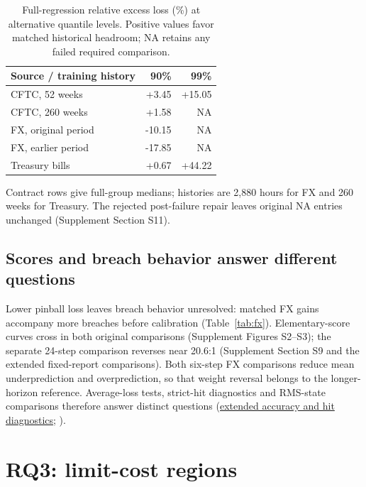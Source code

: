 \documentclass[11pt,a4paper]{article}
\begin{document}
\begin{table}[htbp]\centering\small
\caption{Full-regression relative excess loss (\%) at alternative quantile levels. Positive values favor matched historical headroom; NA retains any failed required comparison.}\label{tab:v12-tau}
\begin{tabular}{lrr}\toprule
Source / training history & 90\% & 99\% \\\midrule
CFTC, 52 weeks & +3.45 & +15.05 \\
CFTC, 260 weeks & +1.58 & \textsc{NA} \\
FX, original period & -10.15 & \textsc{NA} \\
FX, earlier period & -17.85 & \textsc{NA} \\
Treasury bills & +0.67 & +44.22 \\
\bottomrule\end{tabular}
\par\vspace{2pt}\begin{minipage}{.95\linewidth}\footnotesize
Contract rows give full-group medians; histories are 2,880 hours for FX and 260 weeks for Treasury.
The rejected post-failure repair leaves original NA entries unchanged (Supplement Section S11).
\end{minipage}\end{table}


\subsection{Scores and breach behavior answer different questions}

Lower pinball loss leaves breach behavior unresolved: matched FX gains accompany more breaches before calibration (Table~\ref{tab:fx}). Elementary-score curves cross in both original comparisons (Supplement Figures S2--S3); the separate 24-step comparison reverses near 20.6:1 (Supplement Section S9 and the extended fixed-report comparisons). Both six-step FX comparisons reduce mean underprediction and overprediction, so that weight reversal belongs to the longer-horizon reference. Average-loss tests, strict-hit diagnostics and RMS-state comparisons therefore answer distinct questions (\href{https://github.com/ByronLi0207/financial-mathematics-paper-20261020/blob/submission-final/EXTENDED_RESULTS.md#asmbi-extended-s33}{extended accuracy and hit diagnostics}; \citealp{gw2006}).

\FloatBarrier

\section{RQ3: limit-cost regions}\label{sec:cost}
\end{document}
